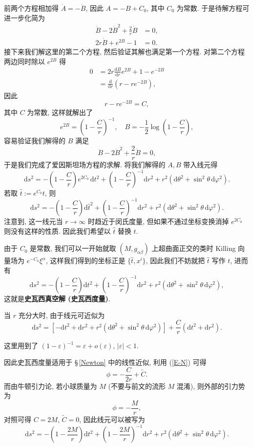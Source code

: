 前两个方程相加得 $ \dot{A}=-\dot{B}$, 因此 $A=-B+C_0$, 其中 $C_0$ 为常数. 于是待解方程可进一步化简为
\begin{align*}
	\ddot{B}-2\dot{B}^2+\frac{2}{r}\dot{B} &= 0,\\
	2r\dot{B}+e^{2B}-1 &= 0.
\end{align*}
接下来我们解这里的第二个方程, 然后验证其解也满足第一个方程. 对第二个方程两边同时除以 $e^{2B}$ 得
\begin{align*}
	0 &= 2r\frac{\mathrm{d} B}{\mathrm{d} r}e^{2B}+1-e^{-2B}\\
	&=\frac{\mathrm{d} }{\mathrm{d} r}\left( r-re^{-2B} \right),
\end{align*}
因此
\[ r-re^{-2B}=C, \] 
其中 $C$ 为常数, 这样就解出了
\[ e^{2B}=\left( 1-\frac{C}{r} \right)^{-1},\quad B=-\frac{1}{2}\log\left( 1-\frac{C}{r} \right), \]
容易验证我们解得的 $B$ 满足
\[ \ddot{B}-2\dot{B}^2+\frac{2}{r}\dot{B} = 0, \] 
于是我们完成了爱因斯坦场方程的求解. 将我们解得的 $A,B$ 带入线元得
\[ \mathrm{d}s^2=-\left( 1-\frac{C}{r} \right)e^{2C_0}\,\mathrm{d}t^2+\left( 1-\frac{C}{r} \right)^{-1}\mathrm{d}r^2+r^2(\mathrm{d}\theta^2+\sin^2\theta\,\mathrm{d}\varphi^2). \] 
若取 $\hat{t}:=e^{C_0}t$, 则
\[ \mathrm{d}s^2=-\left( 1-\frac{C}{r} \right)\mathrm{d}\hat{t}^2+\left( 1-\frac{C}{r} \right)^{-1}\mathrm{d}r^2+r^2(\mathrm{d}\theta^2+\sin^2\theta\,\mathrm{d}\varphi^2). \] 
注意到, 这一线元当 $r\to\infty$ 时趋近于闵氏度量, 但如果不通过坐标变换消掉 $e^{2C_0}$ 则没有这样的性质. 因此我们希望以 $\hat{t}$ 替换 $t$.

由于 $C_0$ 是常数, 我们可以一开始就取 $(M,g_{\alpha\beta})$ 上超曲面正交的类时 Killing 向量场为 $e^{-C_0}\xi^{\alpha}$, 这样我们得到的坐标正是 $\{\hat{t},x^i\}$, 因此我们不妨就把 $\hat{t}$ 写作 $t$, 进而有
\[ \mathrm{d}s^2=-\left( 1-\frac{C}{r} \right)\mathrm{d}t^2+\left( 1-\frac{C}{r} \right)^{-1}\mathrm{d}r^2+r^2(\mathrm{d}\theta^2+\sin^2\theta\,\mathrm{d}\varphi^2), \]
这就是{\bf 史瓦西真空解 (史瓦西度量)}. 

当 $r$ 充分大时, 由于线元可近似为
\[ \mathrm{d}s^2=\left[ -\mathrm{d}t^2+\mathrm{d}r^2+r^2(\mathrm{d}\theta^2+\sin^2\theta\,\mathrm{d}\varphi^2) \right]+\frac{C}{r}(\mathrm{d}t^2+\mathrm{d}r^2). \]
\begin{remark}
	这里用到了 $(1-\varepsilon)^{-1}=\varepsilon+o(\varepsilon)$, $|\varepsilon|<1$.
\end{remark}
因此史瓦西度量适用于 \S\,\ref{Newton} 中的线性近似, 利用 (\ref{E-N}) 可得
\[ \phi=-\frac{C}{2r}+\tilde{C}. \]
而由牛顿引力论, 若小球质量为 $M$ (不要与前文的流形 $M$ 混淆), 则外部的引力势为
\[ \phi=-\frac{M}{r}, \] 
对照可得 $C=2M$, $\tilde{C}=0$, 因此线元可以被写为
\[ \mathrm{d}s^2=-\left( 1-\frac{2M}{r} \right)\mathrm{d}t^2+\left( 1-\frac{2M}{r} \right)^{-1}\mathrm{d}r^2+r^2(\mathrm{d}\theta^2+\sin^2\theta\,\mathrm{d}\varphi^2). \] 

